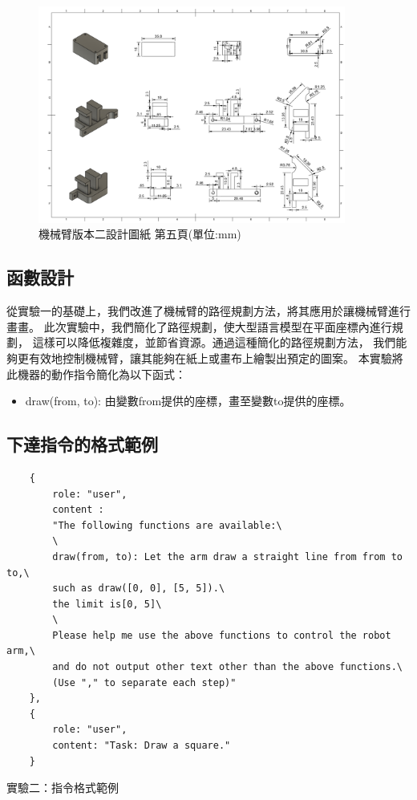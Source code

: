 \documentclass[class=NCU_thesis, crop=false]{standalone}
\begin{document}
\begin{figure}[htbp]
    \centering
    \includegraphics[width=0.9\textwidth]{figures/Armv2 (5).PNG}
    \caption{機械臂版本二設計圖紙 第五頁(單位:mm)}
\end{figure}

\subsection{函數設計}
從實驗一的基礎上，我們改進了機械臂的路徑規劃方法，將其應用於讓機械臂進行畫畫。
此次實驗中，我們簡化了路徑規劃，使大型語言模型在平面座標內進行規劃，
這樣可以降低複雜度，並節省資源。通過這種簡化的路徑規劃方法，
我們能夠更有效地控制機械臂，讓其能夠在紙上或畫布上繪製出預定的圖案。
本實驗將此機器的動作指令簡化為以下函式：

\begin{itemize}
    \item draw(from, to): 由變數from提供的座標，畫至變數to提供的座標。
\end{itemize}

\subsection{下達指令的格式範例}
\begin{listing}
    \begin{verbatim}
    {     
        role: "user",
        content : 
        "The following functions are available:\
        \
        draw(from, to): Let the arm draw a straight line from from to to,\
        such as draw([0, 0], [5, 5]).\
        the limit is[0, 5]\
        \
        Please help me use the above functions to control the robot arm,\
        and do not output other text other than the above functions.\
        (Use "," to separate each step)"
    },
    {
        role: "user", 
        content: "Task: Draw a square."
    }
    \end{verbatim}
\caption{實驗二：指令格式範例} 
\end{listing}
\end{document}
